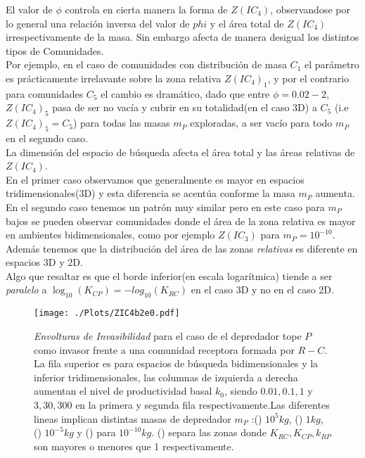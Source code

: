 El valor de $\phi$ controla en cierta manera la forma de $Z(IC_4)$, observandose por lo general una relaci\'on inversa del valor de $phi$ y el \'area total de $Z(IC_4)$ irrespectivamente de la masa. Sin embargo afecta de manera desigual los distintos tipos de Comunidades.\\ Por ejemplo, en el caso de comunidades con distribuci\'on de masa $C_1$ el par\'ametro es pr\'acticamente irrelavante sobre la zona relativa $Z(IC_4)_1$, y por el contrario para comunidades $C_5$ el cambio es dram\'atico, dado que entre $\phi  = 0.02 - 2$, $Z(IC_4)_5$ pasa de ser no vac\'ia y cubrir en su totalidad(en el caso 3D) a $C_5$ (i.e $Z(IC_4)_5 = C_5$) para todas las masas $m_P$ exploradas, a ser vac\'io para todo $m_P$ en el segundo caso.\\
La dimensi\'on del espacio de b\'usqueda afecta el \'area total y las \'areas relativas de $Z(IC_4)$.\\
En el primer caso observamos que generalmente es mayor en espacios tridimensionales(3D) y esta diferencia se acent\'ua conforme la masa $m_P$ aumenta.\\
En el segundo caso tenemos un patr\'on muy similar pero en este caso para $m_P$ bajos se pueden observar comunidades donde el \'area de la zona relativa es mayor en ambientes bidimensionales, como por ejemplo $Z(IC_3)$ para $m_P = 10^{-10}$. \\
Adem\'as tenemos que la distribuci\'on del \'area de las zonas \emph{relativas} es diferente en espacios 3D y 2D.\\
Algo que resaltar es que el borde inferior(en escala logar\'itmica) tiende a ser \emph{paralelo} a $\log_{10}(K_{CP}) = -log_{10}(K_{RC})$ en el caso 3D y no en el caso 2D.


\begin{figure}
  \centering
  \texttt{[image: ./Plots/ZIC4b2e0.pdf]}
  \caption[Env $Z(IC4)$]{\emph{Envolturas de Invasibilidad} para el caso de el depredador tope $P$ como invasor frente a una comunidad receptora formada por $R-C$. La fila superior es para espacios de b\'usqueda bidimensionales y la inferior tridimensionales, las columnas de izquierda a derecha aumentan el nivel de productividad basal $k_0$, siendo $0.01,0.1,1$ y $3,30,300$ en la primera y segunda fila respectivamente.Las diferentes lineas implican distintas masas de depredador $m_P$ :({\hwplotR}) $10^5 kg$,  ({\hwplotY}) $1kg$, ({\hwplotG}) $10^{-5}kg$ y ({\hwplotB}) para $10^{-10}kg$. ({\hwplotK}) separa las zonas donde $K_{RC},K_{CP},k_{RP}$ son mayores o menores que 1 respectivamente.}
  \label{fig:Z(IC4)}
\end{figure}

